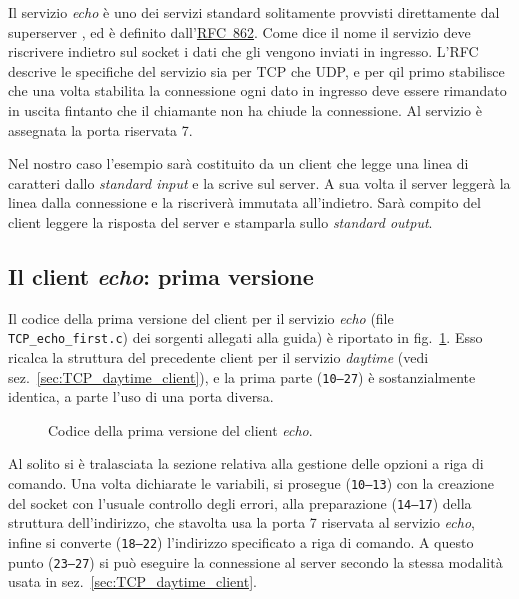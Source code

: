 Il servizio \textit{echo} è uno dei servizi standard solitamente provvisti
direttamente dal superserver , ed è definito
dall'\href{http://www.ietf.org/rfc/rfc862.txt}{RFC~862}. Come dice il nome il
servizio deve riscrivere indietro sul socket i dati che gli vengono inviati in
ingresso. L'RFC descrive le specifiche del servizio sia per TCP che UDP, e per
qil primo stabilisce che una volta stabilita la connessione ogni dato in
ingresso deve essere rimandato in uscita fintanto che il chiamante non ha
chiude la connessione. Al servizio è assegnata la porta riservata 7.

Nel nostro caso l'esempio sarà costituito da un client che legge una linea di
caratteri dallo \textit{standard input} e la scrive sul server. A sua volta il
server leggerà la linea dalla connessione e la riscriverà immutata
all'indietro. Sarà compito del client leggere la risposta del server e
stamparla sullo \textit{standard output}.


\subsection{Il client \textit{echo}: prima versione}
\label{sec:TCP_echo_client}

Il codice della prima versione del client per il servizio \textit{echo} (file
\texttt{TCP\_echo\_first.c}) dei sorgenti allegati alla guida) è riportato in
fig.~\ref{fig:TCP_echo_client_1}. Esso ricalca la struttura del precedente
client per il servizio \textit{daytime} (vedi
sez.~\ref{sec:TCP_daytime_client}), e la prima parte (\texttt{\small 10--27})
è sostanzialmente identica, a parte l'uso di una porta diversa.

\begin{figure}[!htb]
  \footnotesize \centering
  \begin{minipage}[c]{\codesamplewidth}
  \end{minipage} 
  \normalsize
  \caption{Codice della prima versione del client \textit{echo}.}
  \label{fig:TCP_echo_client_1}
\end{figure}

Al solito si è tralasciata la sezione relativa alla gestione delle opzioni a
riga di comando.  Una volta dichiarate le variabili, si prosegue
(\texttt{\small 10--13}) con la creazione del socket con l'usuale controllo
degli errori, alla preparazione (\texttt{\small 14--17}) della struttura
dell'indirizzo, che stavolta usa la porta 7 riservata al servizio
\textit{echo}, infine si converte (\texttt{\small 18--22}) l'indirizzo
specificato a riga di comando.  A questo punto (\texttt{\small 23--27}) si può
eseguire la connessione al server secondo la stessa modalità usata in
sez.~\ref{sec:TCP_daytime_client}.

